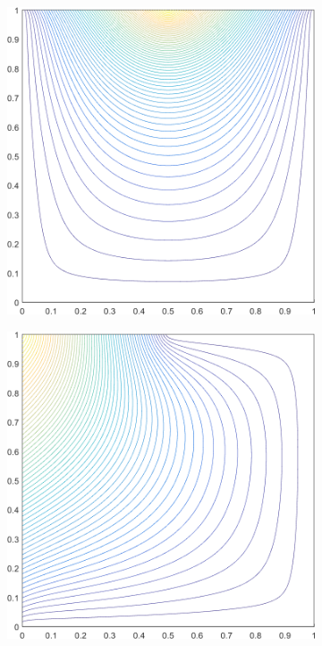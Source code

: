 \begin{figure}
\centering
	\begin{subfigure}[b]{0.39\textwidth}
		\centering
		\includegraphics[width=\textwidth]{figures/sec_BF/deg_square_MV1_contour_b4.png}
		\caption{}
	\end{subfigure}
	\vfill
	\begin{subfigure}[b]{0.39\textwidth}
		\centering
		\includegraphics[width=\textwidth]{figures/sec_BF/deg_square_MV1_contour_b5.png}

\end{subfigure}
\end{figure}
